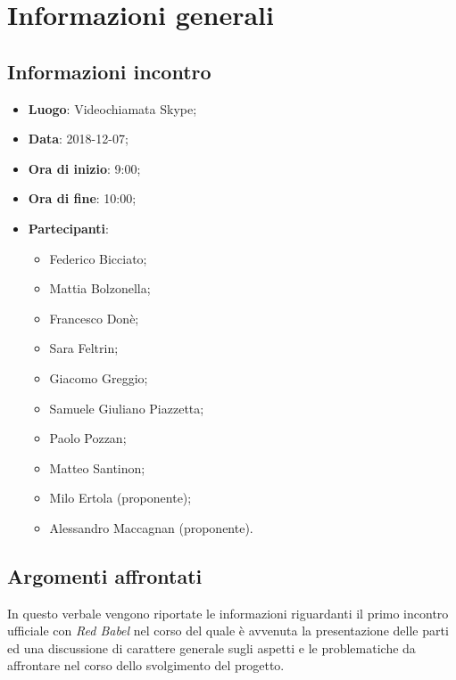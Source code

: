 \section{Informazioni generali}

\subsection{Informazioni incontro}
\begin{itemize}
\item \textbf{Luogo}: Videochiamata Skype;
\item \textbf{Data}: 2018-12-07;
\item \textbf{Ora di inizio}: 9:00;
\item \textbf{Ora di fine}: 10:00;
\item \textbf{Partecipanti}: 
	\begin{itemize}
		\item Federico Bicciato;
		\item Mattia Bolzonella;
		\item Francesco Donè;
		\item Sara Feltrin;
		\item Giacomo Greggio;
		\item Samuele Giuliano Piazzetta;
		\item Paolo Pozzan;
		\item Matteo Santinon;
		\item Milo Ertola (proponente);
		\item Alessandro Maccagnan (proponente).
	\end{itemize}
\end{itemize}

\subsection{Argomenti affrontati}
In questo verbale vengono riportate le informazioni riguardanti il primo incontro 
ufficiale con \textit{Red Babel} nel corso del quale è avvenuta la 
presentazione 
delle parti ed una discussione di carattere generale sugli aspetti e le problematiche
da affrontare nel corso dello svolgimento del progetto.
